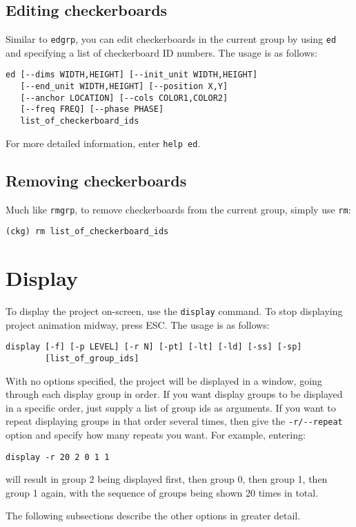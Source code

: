 \documentclass[12pt,titlepage]{article}
\begin{document}
\subsection{Editing checkerboards}
Similar to \texttt{edgrp}, you can edit checkerboards in the current
group by using \texttt{ed} and specifying a list of checkerboard
ID numbers. The usage is as follows:
\begin{lstlisting}
ed [--dims WIDTH,HEIGHT] [--init_unit WIDTH,HEIGHT]
   [--end_unit WIDTH,HEIGHT] [--position X,Y]
   [--anchor LOCATION] [--cols COLOR1,COLOR2]
   [--freq FREQ] [--phase PHASE]
   list_of_checkerboard_ids
\end{lstlisting}
For more detailed information, enter \texttt{help ed}.

\subsection{Removing checkerboards}
Much like \texttt{rmgrp}, to remove checkerboards from the current
group, simply use \texttt{rm}:
\begin{lstlisting}
(ckg) rm list_of_checkerboard_ids
\end{lstlisting}

\section{Display}
To display the project on-screen, use the \texttt{display} command.
To stop displaying project animation midway, press ESC.  The usage is
as follows:
\begin{lstlisting}
display [-f] [-p LEVEL] [-r N] [-pt] [-lt] [-ld] [-ss] [-sp]
        [list_of_group_ids]
\end{lstlisting}
With no options specified, the project will be displayed in a window,
going through each display group in order. If you want display groups
to be displayed in a specific order, just supply a list of group ids
as arguments. If you want to repeat displaying groups in that order
several times, then give the \lstinline{-r/--repeat} option and
specify how many repeats you want. For example, entering:
\begin{lstlisting}
display -r 20 2 0 1 1
\end{lstlisting}
will result in group 2 being displayed first, then group 0, then group
1, then group 1 again, with the sequence of groups being shown 20
times in total.

The following subsections describe the other options in greater
detail.
\end{document}

